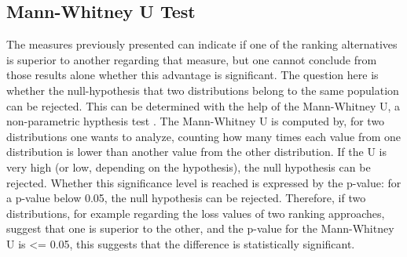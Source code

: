 \subsection{Mann-Whitney U Test}
The measures previously presented can indicate if one of the ranking alternatives is superior to another regarding that measure, but one cannot conclude from those results alone whether this advantage is significant. The question here is whether the null-hypothesis that two distributions belong to the same population can be rejected. This can be determined with the help of the Mann-Whitney U, a non-parametric hypthesis test \cite{mann1947test}. The Mann-Whitney U is computed by, for two distributions one wants to analyze, counting how many times each value from one distribution is lower than another value from the other distribution. If the U is very high (or low, depending on the hypothesis), the null hypothesis can be rejected. Whether this significance level is reached is expressed by the p-value: for a p-value below 0.05, the null hypothesis can be rejected. Therefore, if two distributions, for example regarding the loss values of two ranking approaches, suggest that one is superior to the other, and the p-value for the Mann-Whitney U is <= 0.05, this suggests that the difference is statistically significant.
